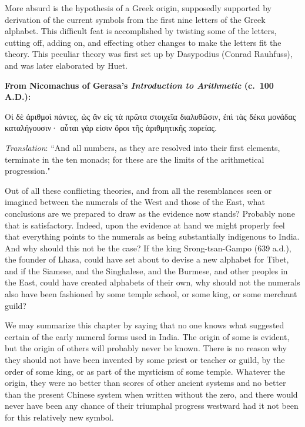 \documentclass[11pt,a4paper]{article}
\newcommand{\gr}[1]{{\greekfont #1}}
\newenvironment{greekpassage}{%
  \begin{tcolorbox}[colback=greekbg,colframe=rulecolor,boxrule=0.5pt,
    left=8pt,right=8pt,top=6pt,bottom=6pt,fontupper=\greekfont]
}{\end{tcolorbox}}
\begin{document}
More absurd is the hypothesis of a Greek origin, supposedly supported by derivation of the current symbols from the first nine letters of the Greek alphabet. This difficult feat is accomplished by twisting some of the letters, cutting off, adding on, and effecting other changes to make the letters fit the theory. This peculiar theory was first set up by Dasypodius (Conrad Rauhfuss), and was later elaborated by Huet.

\begin{greekpassage}
\textbf{From Nicomachus of Gerasa's \textit{Introduction to Arithmetic} (c.~100 A.D.):}

\vspace{0.5em}
\gr{Οἱ δὲ ἀριθμοὶ πάντες, ὡς ἂν εἰς τὰ πρῶτα στοιχεῖα διαλυθῶσιν, ἐπὶ τὰς δέκα μονάδας καταλήγουσιν· αὗται γάρ εἰσιν ὅροι τῆς ἀριθμητικῆς πορείας.}

\vspace{0.5em}
\textit{Translation}: ``And all numbers, as they are resolved into their first elements, terminate in the ten monads; for these are the limits of the arithmetical progression."
\end{greekpassage}

Out of all these conflicting theories, and from all the resemblances seen or imagined between the numerals of the West and those of the East, what conclusions are we prepared to draw as the evidence now stands? Probably none that is satisfactory. Indeed, upon the evidence at hand we might properly feel that everything points to the numerals as being substantially indigenous to India. And why should this not be the case? If the king Srong-tsan-Gampo (639 a.d.), the founder of Lhasa, could have set about to devise a new alphabet for Tibet, and if the Siamese, and the Singhalese, and the Burmese, and other peoples in the East, could have created alphabets of their own, why should not the numerals also have been fashioned by some temple school, or some king, or some merchant guild?

We may summarize this chapter by saying that no one knows what suggested certain of the early numeral forms used in India. The origin of some is evident, but the origin of others will probably never be known. There is no reason why they should not have been invented by some priest or teacher or guild, by the order of some king, or as part of the mysticism of some temple. Whatever the origin, they were no better than scores of other ancient systems and no better than the present Chinese system when written without the zero, and there would never have been any chance of their triumphal progress westward had it not been for this relatively new symbol.
\end{document}
